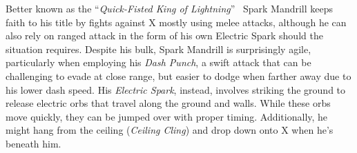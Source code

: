 Better known as the ``\textit{Quick-Fisted King of Lightning}''~\cite{book:MMX_Complete_art} Spark Mandrill keeps faith to his title by fights against X mostly using melee attacks, although he can also rely on ranged attack in the form of his own Electric Spark should the situation requires.
Despite his bulk, Spark Mandrill is surprisingly agile, particularly when employing his \emph{Dash Punch}, a swift attack that can be challenging to evade at close range, but easier to dodge when farther away due to his lower dash speed. His \emph{Electric Spark}, instead, involves striking the ground to release electric orbs that travel along the ground and walls. While these orbs move quickly, they can be jumped over with proper timing. Additionally, he might hang from the ceiling (\emph{Ceiling Cling}) and drop down onto X when he's beneath him. 

